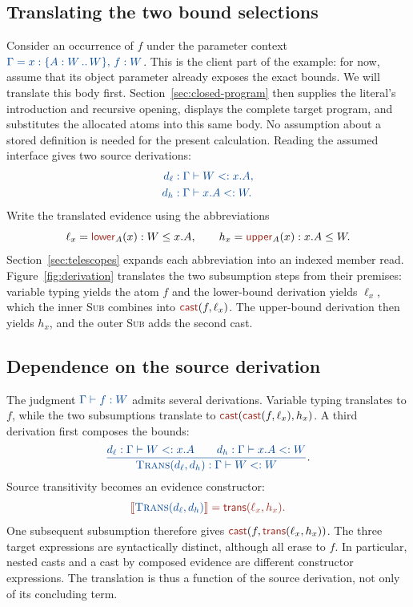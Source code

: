 \subsection*{Translating the two bound selections}
Consider an occurrence of $f$ under the parameter context
$\src{\Gamma=x:\iface{W}{W},\,f:W}$.
This is the client part of the example: for now, assume that its object
parameter already exposes the exact bounds. We will translate this body
first. Section~\ref{sec:closed-program} then supplies the literal's
introduction and recursive opening, displays the complete target program,
and substitutes the allocated atoms into this same body. No assumption
about a stored definition is needed for the present calculation.
Reading the assumed interface gives two source derivations:
\[
\src{\begin{aligned}
d_\ell&:\Gamma\vdash W<:x.A,\\
d_h&:\Gamma\vdash x.A<:W.
\end{aligned}}
\]
Write the translated evidence using the abbreviations
\[
 \ell_x=\ev{lower}_A(x):W\le x.A,\qquad
 h_x=\ev{upper}_A(x):x.A\le W.
\]
Section~\ref{sec:telescopes} expands each abbreviation into an indexed
member read. Figure~\ref{fig:derivation} translates the two subsumption
steps from their premises: variable typing yields the atom $f$ and the
lower-bound derivation yields $\ell_x$, which the inner \textsc{Sub}
combines into $\cast{f}{\ell_x}$. The upper-bound derivation then yields
$h_x$, and the outer \textsc{Sub} adds the second cast.





\subsection*{Dependence on the source derivation}
The judgment $\src{\Gamma\vdash f:W}$ admits several derivations.
Variable typing translates to $f$, while the two subsumptions translate
to $\cast{\cast{f}{\ell_x}}{h_x}$. A third derivation first composes
the bounds:
\[
\src{\frac{d_\ell:\Gamma\vdash W<:x.A\qquad
           d_h:\Gamma\vdash x.A<:W}
          {\textsc{Trans}(d_\ell,d_h):\Gamma\vdash W<:W}}.
\]
Source transitivity becomes an evidence constructor:
\[
\tgt{\tr{\textsc{Trans}(d_\ell,d_h)}
       =\ev{trans}(\ell_x,h_x).}
\]
One subsequent subsumption therefore gives
$\cast{f}{\ev{trans}(\ell_x,h_x)}$.
The three target expressions are syntactically distinct, although all
erase to $f$. In particular, nested casts and a cast by composed evidence
are different constructor expressions. The translation is thus a
function of the source derivation, not only of its concluding term.

